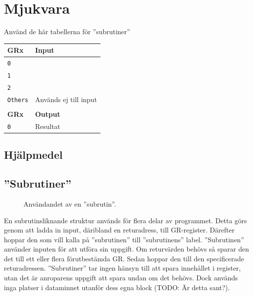 \documentclass[]{article}
\begin{document}
\newpage
\section{Mjukvara}

Använd de här tabellerna för ''subrutiner''\\


\begin{tabular}{ll}
	\textbf{GRx}    & \textbf{Input}        \\ \hline
	\texttt{0}      &  \\
	\texttt{1}      &  \\
	\texttt{2}      &  \\
	\texttt{Others} & Används ej till input \\
	                &  \\
	\textbf{GRx}    & \textbf{Output}       \\ \hline
	\texttt{0}      & Resultat
\end{tabular}


\subsection{Hjälpmedel}

\subsection{''Subrutiner''}
\begin{figure}[h!]
	\caption{Användandet av en ''subrutin''. }
\end{figure}

En subrutinsliknande struktur används för flera delar av programmet. Detta görs genom att ladda in input, däribland en returadress, till GR-register. Därefter hoppar den som vill kalla på ''subrutinen'' till ''subrutinens'' label. ''Subrutinen'' använder inputen för att utföra sin uppgift. Om returvärden behövs så sparar den det till ett eller flera förutbestämda GR. Sedan hoppar den till den specificerade returadressen. ''Subrutiner'' tar ingen hänsyn till att spara innehållet i register, utan det är anroparens uppgift att spara undan om det behövs. Dock används inga platser i dataminnet utanför dess egna block (TODO: Är detta sant?).
\end{document}
